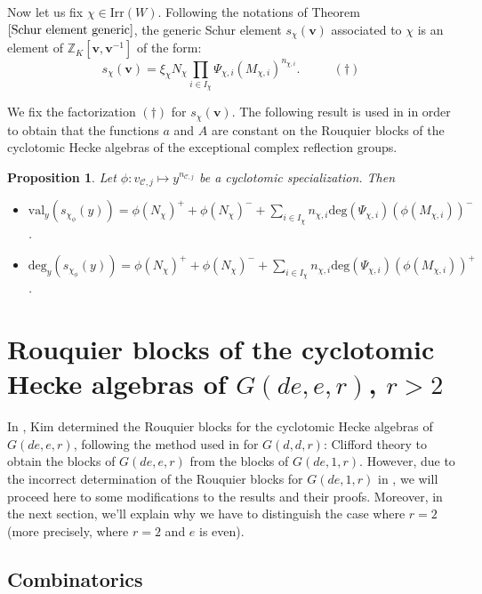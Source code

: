 \documentclass[10pt,a4paper,titlepage]{article}
\newtheorem{proposition}[theorem]{Proposition}
\begin{document}
Now let us fix $\chi \in
\mathrm{Irr}(W)$. Following the notations of Theorem $\ref{Schur element generic}$, the generic Schur 
element $s_\chi(\textbf{v})$
associated to $\chi$ is an element of
$\mathbb{Z}_K[\textbf{v},\textbf{v}^{-1}]$ of the form:
$$s_\chi(\textbf{v})=\xi_\chi N_\chi \prod_{i \in I_\chi} \Psi_{\chi,i}(M_{\chi,i})^{n_{\chi,i}}.\,\,\,\,\,\,\,\,\,\,\,\,\,\,\,\,(\dag)$$

We fix the factorization $(\dag)$ for $s_\chi(\textbf{v}).$ The following result is used in \cite{ChDeg} in order to obtain that the functions $a$ and $A$ are constant on the Rouquier blocks of the cyclotomic Hecke algebras of the exceptional complex reflection groups. 

\begin{proposition}\label{Aa formula}
Let $\phi:v_{\mathcal{C},j} \mapsto y^{n_{\mathcal{C},j}}$ be a
cyclotomic specialization. Then
\begin{itemize}
  \item $\mathrm{val}_y(s_{\chi_\phi}(y)) =
 \phi(N_\chi)^+ +\phi(N_\chi)^-+
  \sum_{i \in I_\chi}
  n_{\chi,i}\mathrm{deg}(\Psi_{\chi,i})(\phi(M_{\chi,i}))^-$.
  \item $\mathrm{deg}_y(s_{\chi_\phi}(y)) =\phi(N_\chi)^++\phi(N_\chi)^-+
  \sum_{i \in I_\chi}
  n_{\chi,i}\mathrm{deg}(\Psi_{\chi,i})(\phi(M_{\chi,i}))^+$.
\end{itemize}
\end{proposition}




\section {Rouquier blocks of the cyclotomic Hecke algebras of $G(de,e,r)$, $r>2$}

In \cite{Kim}, Kim determined the Rouquier blocks for the cyclotomic Hecke algebras of $G(de,e,r)$, following the method used in \cite{BK} for $G(d,d,r)$: Clifford theory to obtain the blocks of $G(de,e,r)$ from the blocks of $G(de,1,r)$. However, due to the incorrect determination of the Rouquier blocks for $G(de,1,r)$ in \cite{BK}, we will proceed here to some modifications to the results and their proofs. 
Moreover, in the next section, we'll explain why we have to distinguish the case where $r=2$ (more precisely, where $r=2$ and $e$ is even).

\subsection {Combinatorics}
\end{document}
